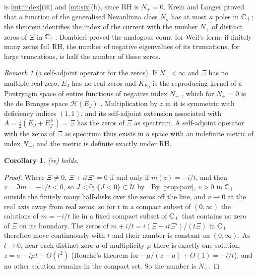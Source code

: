 \documentclass[11pt]{article}
\newtheorem{corollary}[theorem]{Corollary}
\theoremstyle{definition}\newtheorem{definition}[theorem]{Definition}
\theoremstyle{remark}\newtheorem{remark}[theorem]{Remark}
\begin{document}
 is \cref{mt:index}(iii) and \cref{mt:six}(b), since RH is $N_+=0$. Krein and Langer \cite{KL} proved that a function of the generalised Nevanlinna class $N_\kappa$ has at most $\kappa$ poles in $\mathbb C_+$; the theorem identifies the index of the current with the number $N_+$ of distinct zeros of $\Xi$ in $\mathbb C_+$. Bombieri \cite{Bombieri} proved the analogous count for Weil's form: if finitely many zeros fail RH, the number of negative eigenvalues of its truncations, for large truncations, is half the number of these zeros.

\begin{remark}[a self-adjoint operator for the zeros]\label{rem:hp}
If $N_+<\infty$ and $\Xi$ has no multiple real zero, $E_J$ has no real zeros and $K_{E_J}$ is the reproducing kernel of a Pontryagin space of entire functions of negative index $N_+$ \cite{KW}, which for $N_+=0$ is the de Branges space $\mathcal H(E_J)$ \cite{deBrangesBook}. Multiplication by $z$ in it is symmetric with deficiency indices $(1,1)$, and its self-adjoint extension associated with $A=\frac12(E_J+E_J^\#)=\Xi$ has the zeros of $\Xi$ as spectrum. A self-adjoint operator with the zeros of $\Xi$ as spectrum thus exists in a space with an indefinite metric of index $N_+$, and the metric is definite exactly under RH.
\end{remark}

\begin{corollary}\label{cor:shadowcount}
(iv) holds.
\end{corollary}
\begin{proof}
Where $\Xi\ne0$, $\Xi+it\Xi'=0$ if and only if $m(z)=-i/t$, and then $v=\Im m=-1/t<0$, so $J<0$; $\{J<0\}\subset\mathcal U$ by \cite{S01}. By \cref{prop:pair}, $v>0$ in $\mathbb C_+$ outside the finitely many half-disks over the zeros off the line, and $v\to0$ at the real axis away from real zeros; so for $t$ in a compact subset of $(0,\infty)$ the solutions of $m=-i/t$ lie in a fixed compact subset of $\mathbb C_+$ that contains no zero of $\Xi$ on its boundary. The zeros of $m+i/t=i(\Xi+it\Xi')/(t\Xi)$ in $\mathbb C_+$ therefore move continuously with $t$ and their number is constant on $(0,\infty)$. As $t\to0$, near each distinct zero $a$ of multiplicity $\mu$ there is exactly one solution, $z=a-i\mu t+O(t^2)$ (Rouch\'e's theorem for $-\mu/(z-a)+O(1)=-i/t$), and no other solution remains in the compact set. So the number is $N_+$.
\end{proof}
\end{document}
